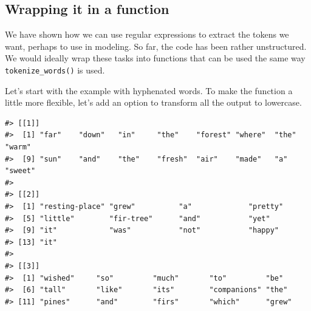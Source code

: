 \documentclass[
]{krantz}
\makeatletter
\newenvironment{Shaded}{\begin{snugshade}}{\end{snugshade}}
\newcommand{\AttributeTok}[1]{\textcolor[rgb]{0.77,0.63,0.00}{#1}}
\newcommand{\ConstantTok}[1]{\textcolor[rgb]{0.00,0.00,0.00}{#1}}
\newcommand{\ControlFlowTok}[1]{\textcolor[rgb]{0.13,0.29,0.53}{\textbf{#1}}}
\newcommand{\DecValTok}[1]{\textcolor[rgb]{0.00,0.00,0.81}{#1}}
\newcommand{\FunctionTok}[1]{\textcolor[rgb]{0.00,0.00,0.00}{#1}}
\newcommand{\NormalTok}[1]{#1}
\newcommand{\OtherTok}[1]{\textcolor[rgb]{0.56,0.35,0.01}{#1}}
\newcommand{\SpecialCharTok}[1]{\textcolor[rgb]{0.00,0.00,0.00}{#1}}
\newcommand{\StringTok}[1]{\textcolor[rgb]{0.31,0.60,0.02}{#1}}
\newenvironment{kframe}{%
\medskip{}
\setlength{\fboxsep}{.8em}
 \def\at@end@of@kframe{}%
 \ifinner\ifhmode%
  \def\at@end@of@kframe{\end{minipage}}%
  \begin{minipage}{\columnwidth}%
 \fi\fi%
 \def\FrameCommand##1{\hskip\@totalleftmargin \hskip-\fboxsep
 \colorbox{shadecolor}{##1}\hskip-\fboxsep
     \hskip-\linewidth \hskip-\@totalleftmargin \hskip\columnwidth}%
 \MakeFramed {\advance\hsize-\width
   \@totalleftmargin\z@ \linewidth\hsize
   \@setminipage}}%
 {\par\unskip\endMakeFramed%
 \at@end@of@kframe}
\renewenvironment{Shaded}{\begin{kframe}}{\end{kframe}}
\makeatother
\begin{document}
\hypertarget{wrapping-it-in-a-function}{%
\subsection{Wrapping it in a function}\label{wrapping-it-in-a-function}}

We have shown how we can use regular expressions to extract the tokens we want, perhaps to use in modeling. So far, the code has been rather unstructured. We would ideally wrap these tasks into functions that can be used the same way \texttt{tokenize\_words()} is used.

Let's start with the example with hyphenated words. To make the function a little more flexible, let's add an option to transform all the output to lowercase.

\begin{Shaded}
\end{Shaded}

\begin{verbatim}
#> [[1]]
#>  [1] "far"    "down"   "in"     "the"    "forest" "where"  "the"    "warm"  
#>  [9] "sun"    "and"    "the"    "fresh"  "air"    "made"   "a"      "sweet" 
#> 
#> [[2]]
#>  [1] "resting-place" "grew"          "a"             "pretty"       
#>  [5] "little"        "fir-tree"      "and"           "yet"          
#>  [9] "it"            "was"           "not"           "happy"        
#> [13] "it"           
#> 
#> [[3]]
#>  [1] "wished"     "so"         "much"       "to"         "be"        
#>  [6] "tall"       "like"       "its"        "companions" "the"       
#> [11] "pines"      "and"        "firs"       "which"      "grew"
\end{verbatim}
\end{document}
